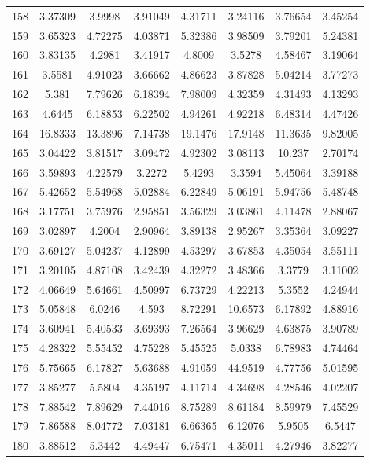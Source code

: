 \begin{center}
\begin{longtable}{cccccccc}
158 & 3.37309 & 3.9998 & 3.91049 & 4.31711 & 3.24116 & 3.76654 & 3.45254\\
159 & 3.65323 & 4.72275 & 4.03871 & 5.32386 & 3.98509 & 3.79201 & 5.24381\\
160 & 3.83135 & 4.2981 & 3.41917 & 4.8009 & 3.5278 & 4.58467 & 3.19064\\
161 & 3.5581 & 4.91023 & 3.66662 & 4.86623 & 3.87828 & 5.04214 & 3.77273\\
162 & 5.381 & 7.79626 & 6.18394 & 7.98009 & 4.32359 & 4.31493 & 4.13293\\
163 & 4.6445 & 6.18853 & 6.22502 & 4.94261 & 4.92218 & 6.48314 & 4.47426\\
164 & 16.8333 & 13.3896 & 7.14738 & 19.1476 & 17.9148 & 11.3635 & 9.82005\\
165 & 3.04422 & 3.81517 & 3.09472 & 4.92302 & 3.08113 & 10.237 & 2.70174\\
166 & 3.59893 & 4.22579 & 3.2272 & 5.4293 & 3.3594 & 5.45064 & 3.39188\\
167 & 5.42652 & 5.54968 & 5.02884 & 6.22849 & 5.06191 & 5.94756 & 5.48748\\
168 & 3.17751 & 3.75976 & 2.95851 & 3.56329 & 3.03861 & 4.11478 & 2.88067\\
169 & 3.02897 & 4.2004 & 2.90964 & 3.89138 & 2.95267 & 3.35364 & 3.09227\\
170 & 3.69127 & 5.04237 & 4.12899 & 4.53297 & 3.67853 & 4.35054 & 3.55111\\
171 & 3.20105 & 4.87108 & 3.42439 & 4.32272 & 3.48366 & 3.3779 & 3.11002\\
172 & 4.06649 & 5.64661 & 4.50997 & 6.73729 & 4.22213 & 5.3552 & 4.24944\\
173 & 5.05848 & 6.0246 & 4.593 & 8.72291 & 10.6573 & 6.17892 & 4.88916\\
174 & 3.60941 & 5.40533 & 3.69393 & 7.26564 & 3.96629 & 4.63875 & 3.90789\\
175 & 4.28322 & 5.55452 & 4.75228 & 5.45525 & 5.0338 & 6.78983 & 4.74464\\
176 & 5.75665 & 6.17827 & 5.63688 & 4.91059 & 44.9519 & 4.77756 & 5.01595\\
177 & 3.85277 & 5.5804 & 4.35197 & 4.11714 & 4.34698 & 4.28546 & 4.02207\\
178 & 7.88542 & 7.89629 & 7.44016 & 8.75289 & 8.61184 & 8.59979 & 7.45529\\
179 & 7.86588 & 8.04772 & 7.03181 & 6.66365 & 6.12076 & 5.9505 & 6.5447\\
180 & 3.88512 & 5.3442 & 4.49447 & 6.75471 & 4.35011 & 4.27946 & 3.82277\\

\end{longtable}
\end{center}
